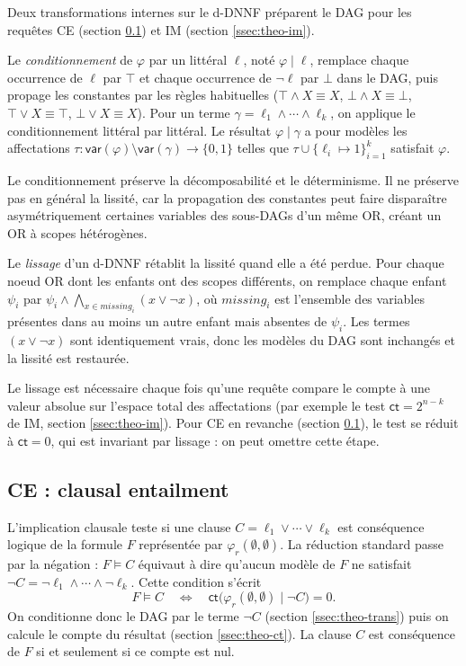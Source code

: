 \documentclass[11pt,a4paper]{report}
\theoremstyle{plain}
\theoremstyle{definition}
\begin{document}
Deux transformations internes sur le d-DNNF préparent le DAG pour les
requêtes CE (section \ref{ssec:theo-ce}) et IM
(section \ref{ssec:theo-im}).

Le \emph{conditionnement} de $\varphi$ par un littéral $\ell$, noté
$\varphi \mid \ell$, remplace chaque occurrence de $\ell$ par $\top$
et chaque occurrence de $\neg \ell$ par $\bot$ dans le DAG, puis
propage les constantes par les règles habituelles
($\top \wedge X \equiv X$, $\bot \wedge X \equiv \bot$,
$\top \vee X \equiv \top$, $\bot \vee X \equiv X$). Pour un terme
$\gamma = \ell_1 \wedge \cdots \wedge \ell_k$, on applique le
conditionnement littéral par littéral. Le résultat $\varphi \mid \gamma$
a pour modèles les affectations
$\tau : \mathsf{var}(\varphi) \setminus \mathsf{var}(\gamma) \to \{0, 1\}$
telles que $\tau \cup \{\ell_i \mapsto 1\}_{i=1}^{k}$ satisfait
$\varphi$.

Le conditionnement préserve la décomposabilité et le déterminisme. Il
ne préserve pas en général la lissité, car la propagation des
constantes peut faire disparaître asymétriquement certaines variables
des sous-DAGs d'un même OR, créant un OR à scopes hétérogènes.

Le \emph{lissage} d'un d-DNNF rétablit la lissité quand elle a été
perdue. Pour chaque noeud OR dont les enfants ont des scopes différents,
on remplace chaque enfant $\psi_i$ par
$\psi_i \wedge \bigwedge_{x \in \mathit{missing}_i} (x \vee \neg x)$,
où $\mathit{missing}_i$ est l'ensemble des variables présentes dans au
moins un autre enfant mais absentes de $\psi_i$. Les termes
$(x \vee \neg x)$ sont identiquement vrais, donc les modèles du DAG
sont inchangés et la lissité est restaurée.

Le lissage est nécessaire chaque fois qu'une requête compare le compte
à une valeur absolue sur l'espace total des affectations (par exemple
le test $\mathsf{ct} = 2^{n-k}$ de IM, section \ref{ssec:theo-im}).
Pour CE en revanche (section \ref{ssec:theo-ce}), le test se réduit
à $\mathsf{ct} = 0$, qui est invariant par lissage : on peut omettre
cette étape.

\subsection{CE : clausal entailment}
\label{ssec:theo-ce}

L'implication clausale teste si une clause
$C = \ell_1 \vee \cdots \vee \ell_k$ est conséquence logique de la
formule $F$ représentée par $\varphi_r(\emptyset, \emptyset)$. La
réduction standard passe par la négation : $F \models C$ équivaut à
dire qu'aucun modèle de $F$ ne satisfait
$\neg C = \neg \ell_1 \wedge \cdots \wedge \neg \ell_k$. Cette
condition s'écrit
\[
  F \models C
  \quad \Longleftrightarrow \quad
  \mathsf{ct}\bigl(\varphi_r(\emptyset, \emptyset) \mid \neg C\bigr) = 0.
\]
On conditionne donc le DAG par le terme $\neg C$
(section \ref{ssec:theo-trans}) puis on calcule le compte du résultat
(section \ref{ssec:theo-ct}). La clause $C$ est conséquence de $F$ si
et seulement si ce compte est nul.
\end{document}
